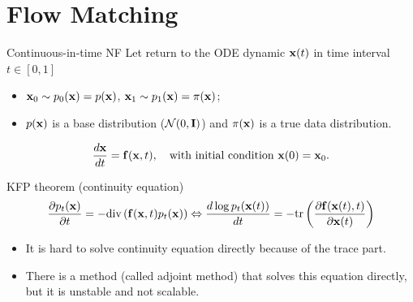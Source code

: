 \section{Flow Matching}
\begin{frame}{Continuous-in-time NF}
	Let return to the ODE dynamic $\mathbf{x}(t)$ in time interval $t \in [0, 1]$
	\begin{itemize}
	\item $\mathbf{x}_0 \sim p_0(\mathbf{x}) = p(\mathbf{x})$, $\mathbf{x}_1 \sim p_1(\mathbf{x}) =  \pi(\mathbf{x})$;
	\item $p(\mathbf{x})$ is a base distribution ($\mathcal{N}(0, \mathbf{I})$) and $\pi(\mathbf{x})$ is a true data distribution.
	\end{itemize} 
	\[
		\frac{d \mathbf{x}}{dt} = \mathbf{f} (\mathbf{x}, t),  \quad \text{with initial condition }\mathbf{x}(0) = \mathbf{x}_0.
	\]
	\vspace{-0.3cm}
	\begin{block}{KFP theorem (continuity equation)}
		\vspace{-0.5cm}
		\[
			\frac{\partial p_t(\mathbf{x})}{\partial t} = - \text{div}\left(\mathbf{f}(\mathbf{x}, t) p_t(\mathbf{x})\right) \Leftrightarrow \frac{d \log p_t(\mathbf{x}(t))}{d t} = - \text{tr} \left( \frac{\partial \mathbf{f}(\mathbf{x}(t), t)}{\partial \mathbf{x}(t)} \right)
		\]
		\vspace{-0.3cm}
	\end{block}
	\begin{itemize}
		\item It is hard to solve continuity equation directly because of the trace part. 
		\item There is a method (called adjoint method) that solves this equation directly, but it is unstable and not scalable.
	\end{itemize}
\end{frame}
